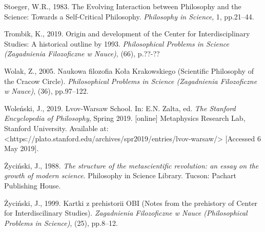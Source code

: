 \documentclass[a4paper]{article}
\begin{document}
Stoeger, W.R., 1983. The Evolving Interaction between Philosophy and the Science: Towards a Self-Critical Philosophy.
\textit{Philosophy in Science}, 1, pp.21–44.

Trombik, K., 2019. Origin and development of the Center for Interdisciplinary Studies: A historical outline by 1993.
\textit{Philosophical Problems in Science (Zagadnienia Filozoficzne w Nauce)}, (66), p.??-??

Wolak, Z., 2005. Naukowa filozofia Koła Krakowskiego (Scientific Philosophy of the Cracow Circle). \textit{Philosophical
Problems in Science (Zagadnienia Filozoficzne w Nauce)}, (36), pp.97–122.

Woleński, J., 2019. Lvov-Warsaw School. In: E.N. Zalta, ed. \textit{The Stanford Encyclopedia of Philosophy}, Spring
2019. [online] Metaphysics Research Lab, Stanford University. Available at:
{\textless}https://plato.stanford.edu/archives/spr2019/entries/lvov-warsaw/{\textgreater} [Accessed 6 May 2019].

Życiński, J., 1988. \textit{The structure of the metascientific revolution: an essay on the growth of modern science}.
Philosophy in Science Library. Tucson: Pachart Publishing House.

Życiński, J., 1999. Kartki z prehistorii OBI (Notes from the prehistory of Center for Interdiscilinary Studies).
\textit{Zagadnienia Filozoficzne w Nauce (Philosophical Problems in Science)}, (25), pp.8–12.
\end{document}
